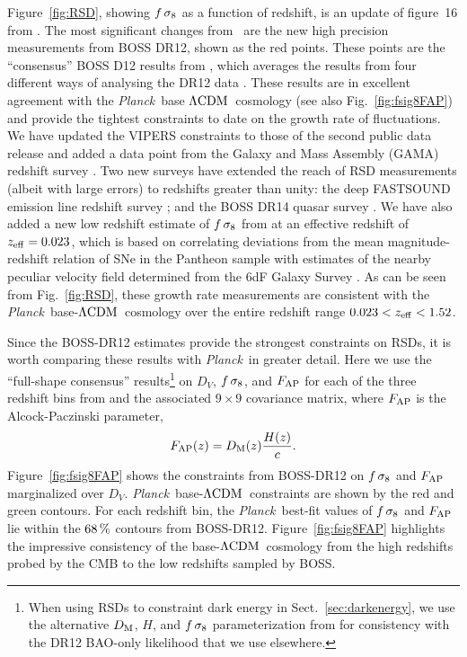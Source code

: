 \documentclass[longauth,traditabstract]{aa}
\def\Planck{\textit{Planck}}
\def\,{\thinspace}
\newcommand{\DM}{D_{\rm M}}
\providecommand{\LCDM}{{$\rm{\Lambda CDM}$}}
\newcommand{\paramsII}{\citetalias{planck2014-a15}}
\begin{document}
Figure~\ref{fig:RSD}, showing $f\,\sigma_8$ as a function of redshift,
is an update of figure~16 from \paramsII. The most significant changes
from \paramsII\ are the new high precision measurements from BOSS DR12,
shown as the red points.  These points are the ``consensus'' BOSS D12
results from \citet{Alam:2016hwk}, which averages the results from
four different ways of analysing the DR12 data
\citep{Beutler:2017,Grieb:2017,Sanchez:2017, Satapathy:2017}. These
results are in excellent agreement with the \Planck\ base
\LCDM\ cosmology (see also Fig.~\ref{fig:fsig8FAP}) and provide
the tightest constraints to date on the growth rate of
fluctuations. We have updated the VIPERS constraints to those of the
second public data release \citep{Pezzotta:2016gbo} and added a data
point from the Galaxy and Mass Assembly (GAMA) redshift survey
\citep{Blake:2012pj}. Two new surveys have extended the reach of RSD
measurements (albeit with large errors) to redshifts greater than
unity: the deep FASTSOUND emission line redshift survey
\citep{Okumura:2015lvp}; and the BOSS DR14 quasar survey
\citep{Zarrouk:2018vwy}. We have also added a new low redshift
estimate of $f\,\sigma_8$ from \cite{Huterer:2016uyq} at an effective
redshift of $z_{\rm eff} = 0.023$, which is based on correlating deviations
from the mean magnitude-redshift relation of SNe in the Pantheon
sample with estimates of the nearby peculiar velocity field determined
from the 6dF Galaxy Survey \citep{Springob:2014}. As can be seen from Fig.~\ref{fig:RSD},
these growth rate measurements are consistent with the \Planck\ base-\LCDM\ cosmology over
the entire redshift range $0.023 < z_{\rm eff} < 1.52$.



Since the BOSS-DR12 estimates provide the strongest constraints on RSDs, it is worth comparing these results with
\Planck\ in greater detail. Here we use the ``full-shape consensus'' results\footnote{When using RSDs to constraint dark energy in Sect.~\ref{sec:darkenergy}, we use the alternative
$\DM$, $H$, and $f\,\sigma_8$ parameterization from \cite{Alam:2016hwk} for consistency with the
DR12 BAO-only likelihood that we use elsewhere.
} on $D_V$, $f\,\sigma_8$, and $F_{\rm AP}$ for each of the three
redshift bins from \cite{Alam:2016hwk} and the associated $9\times9$ covariance matrix, where $F_{\rm AP}$
is the Alcock-Paczinski parameter,
\begin{equation}
F_{\rm AP}(z) = \DM(z) {H(z) \over c}.
\label{eq:RSD2}
\end{equation}
Figure~\ref{fig:fsig8FAP} shows the constraints from BOSS-DR12 on $f\,\sigma_8$
and $F_{\rm AP}$ marginalized over $D_V$. \Planck\ base-\LCDM\ constraints are shown by the red and green contours. For each
redshift bin, the \Planck\ best-fit values of $f\,\sigma_8$ and $F_{\rm AP}$ lie within the $68\,\%$ contours from BOSS-DR12.
Figure~\ref{fig:fsig8FAP} highlights the impressive consistency of the base-\LCDM\ cosmology from the high redshifts probed
by the CMB to the low redshifts sampled by BOSS.
\end{document}

